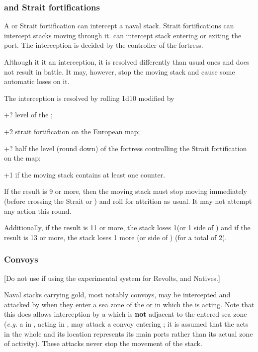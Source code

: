 \subsubsection{\Presidios and Strait fortifications}
A \Presidio or Strait fortification can intercept a naval stack. Strait
fortifications can intercept stacks moving through it. \Presidios can
intercept stack entering or exiting the port. The interception is decided by
the controller of the fortress.

Although it it an interception, it is resolved differently than usual ones and
does not result in battle. It may, however, stop the moving stack and cause
some automatic loses on it.

The interception is resolved by rolling 1d10 modified by
\begin{modlist}
\item[+?] level of the \Presidio;
\item[+2] strait fortification on the European map;
\item[+?] half the level (round down) of the fortress controlling the Strait
  fortification on the \ROTW map;
\item[+1] if the moving stack contains at least one \FLEET counter.
\end{modlist}

If the result is 9 or more, then the moving stack must stop moving immediately
(before crossing the Strait or \Presidio) and roll for attrition as usual. It
may not attempt any action this round.

Additionally, if the result is 11 or more, the stack loses 1\ND (or 1 side of
\corsaire) and if the result is 13 or more, the stack loses 1 more \ND (or
side of \corsaire) (for a total of 2).

\subsubsection{Convoys}
[Do not use if using the experimental system for Revolts, \corsaire and
Natives.]

Naval stacks carrying gold, most notably convoys, may be intercepted and
attacked by \corsaire when they enter a sea zone of the \STZ or \CTZ in which
the \corsaire is acting. Note that this does allows interception by a
\corsaire which is \textbf{not} adjacent to the entered sea zone (\emph{e.g.}
a \corsaire in , acting in , may
attack a convoy entering \seazoneMexique; it is assumed that the \corsaire
acts in the whole \STZ and its location represents its main ports rather than
its actual zone of activity). These attacks never stop the movement of the
stack.

